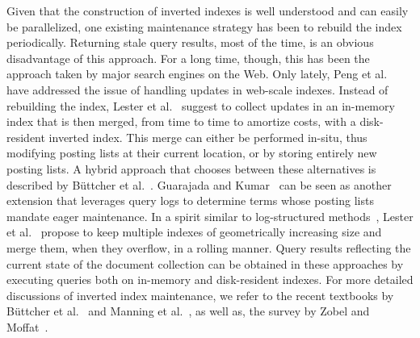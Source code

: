 Given that the construction of inverted indexes is well understood and
can easily be parallelized, one existing maintenance strategy has been
to rebuild the index periodically. Returning stale query results, most
of the time, is an obvious disadvantage of this approach. For a long
time, though, this has been the approach taken by major search engines
on the Web. Only lately, Peng et al.~\cite{Peng:2010fk} have addressed
the issue of handling updates in web-scale indexes. Instead of
rebuilding the index, Lester et al.~\cite{Lester:2006ly} suggest to
collect updates in an in-memory index that is then merged, from time
to time to amortize costs, with a disk-resident inverted index. This
merge can either be performed in-situ, thus modifying posting lists at
their current location, or by storing entirely new posting lists. A
hybrid approach that chooses between these alternatives is described
by B\"uttcher et al.~\cite{Buttcher:2008fk}. Guarajada and
Kumar~\cite{Gurajada:2009vn} can be seen as another extension that
leverages query logs to determine terms whose posting lists mandate
eager maintenance. In a spirit similar to log-structured
methods~\cite{ONeil:1996fk}, Lester et al.~\cite{Lester:2008qf}
propose to keep multiple indexes of geometrically increasing size and
merge them, when they overflow, in a rolling manner. Query results
reflecting the current state of the document collection can be
obtained in these approaches by executing queries both on in-memory
and disk-resident indexes. For more detailed discussions of inverted
index maintenance, we refer to the recent textbooks by B\"uttcher et
al.~\cite{BuettcherCC10} and Manning et al.~\cite{manning:2008}, as
well as, the survey by Zobel and
Moffat~\cite{DBLP:journals/csur/ZobelM06}.

